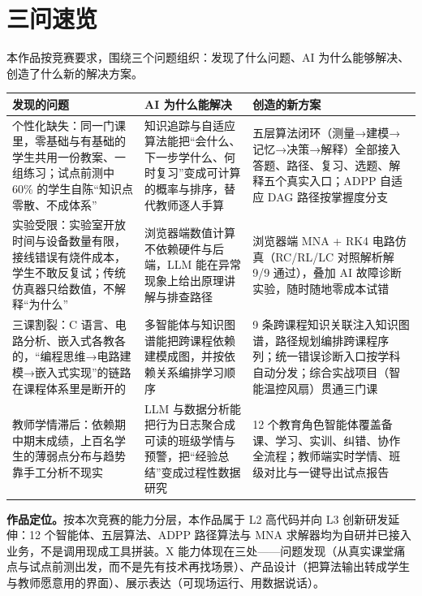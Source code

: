 \documentclass[zihao=-4,a4paper,UTF8,fontset=windows]{ctexart}
\begin{document}
\newpage
\section*{三问速览}


本作品按竞赛要求，围绕三个问题组织：发现了什么问题、AI 为什么能够解决、创造了什么新的解决方案。


\par\noindent\begin{tabular}{|p{3.4cm}|p{4.3cm}|p{5.2cm}|}
\hline
\textbf{发现的问题} & \textbf{AI 为什么能解决} & \textbf{创造的新方案} \\ \hline
个性化缺失：同一门课里，零基础与有基础的学生共用一份教案、一组练习；试点前测中 60\% 的学生自陈“知识点零散、不成体系” & 知识追踪与自适应算法能把“会什么、下一步学什么、何时复习”变成可计算的概率与排序，替代教师逐人手算 & 五层算法闭环（测量→建模→记忆→决策→解释）全部接入答题、路径、复习、选题、解释五个真实入口；ADPP 自适应 DAG 路径按掌握度分支 \\ \hline
实验受限：实验室开放时间与设备数量有限，接线错误有烧件成本，学生不敢反复试；传统仿真器只给数值，不解释“为什么” & 浏览器端数值计算不依赖硬件与后端，LLM 能在异常现象上给出原理讲解与排查路径 & 浏览器端 MNA + RK4 电路仿真（RC/RL/LC 对照解析解 9/9 通过），叠加 AI 故障诊断实验，随时随地零成本试错 \\ \hline
三课割裂：C 语言、电路分析、嵌入式各教各的，“编程思维→电路建模→嵌入式实现”的链路在课程体系里是断开的 & 多智能体与知识图谱能把跨课程依赖建模成图，并按依赖关系编排学习顺序 & 9 条跨课程知识关联注入知识图谱，路径规划编排跨课程序列；统一错误诊断入口按学科自动分发；综合实战项目（智能温控风扇）贯通三门课 \\ \hline
教师学情滞后：依赖期中期末成绩，上百名学生的薄弱点分布与趋势靠手工分析不现实 & LLM 与数据分析能把行为日志聚合成可读的班级学情与预警，把“经验总结”变成过程性数据研究 & 12 个教育角色智能体覆盖备课、学习、实训、纠错、协作全流程；教师端实时学情、班级对比与一键导出试点报告 \\ \hline
\end{tabular}\par


\textbf{作品定位。}按本次竞赛的能力分层，本作品属于 L2 高代码并向 L3 创新研发延伸：12 个智能体、五层算法、ADPP 路径算法与 MNA 求解器均为自研并已接入业务，不是调用现成工具拼装。X 能力体现在三处——问题发现（从真实课堂痛点与试点前测出发，而不是先有技术再找场景）、产品设计（把算法输出转成学生与教师愿意用的界面）、展示表达（可现场运行、用数据说话）。
\end{document}
